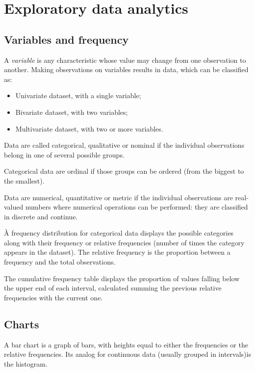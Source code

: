 \section{Exploratory data analytics}

\subsection{Variables and frequency}
A \textit{variable} is any characteristic whose value may change from one observation to another. Making observations on variables results in data, which can be classified as:
\begin{itemize}
	\item Univariate dataset, with a single variable;
	\item Bivariate dataset, with two variables;
	\item Multivariate dataset, with two or more variables.
\end{itemize}

Data are called categorical, qualitative or nominal if the individual observations belong in one of several possible groups.

Categorical data are ordinal if those groups can be ordered (from the biggest to the smallest).

Data are numerical, quantitative or metric if the individual observations are real-valued numbers where numerical operations can be performed: they are classified in discrete and continue.

À frequency distribution for categorical data displays the possible categories along with their frequency or relative frequencies (number of times the category appears in the dataset). The relative frequency is the proportion between a frequency and the total observations.

The cumulative frequency table displays the proportion of values falling below the upper end of each interval, calculated summing the previous relative frequencies with the current one.

\subsection{Charts}
A bar chart is a graph of bars, with heights equal to either the frequencies or the relative frequencies. Its analog for continuous data (usually grouped in intervals)is the histogram.

